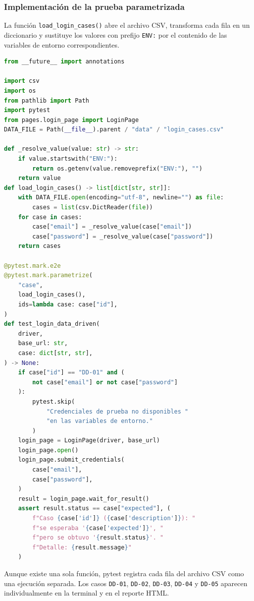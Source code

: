 \documentclass{article}
\begin{document}
\subsubsection{Implementación de la prueba parametrizada}

La función \texttt{load\_login\_cases()} abre el archivo CSV, transforma cada fila en un diccionario y sustituye los valores con prefijo \texttt{ENV:} por el contenido de las variables de entorno correspondientes.

\begin{lstlisting}[language=Python,caption={Prueba data-driven con \texttt{@pytest.mark.parametrize}}]
from __future__ import annotations

import csv
import os
from pathlib import Path
import pytest
from pages.login_page import LoginPage
DATA_FILE = Path(__file__).parent / "data" / "login_cases.csv"

def _resolve_value(value: str) -> str:
    if value.startswith("ENV:"):
        return os.getenv(value.removeprefix("ENV:"), "")
    return value
def load_login_cases() -> list[dict[str, str]]:
    with DATA_FILE.open(encoding="utf-8", newline="") as file:
        cases = list(csv.DictReader(file))
    for case in cases:
        case["email"] = _resolve_value(case["email"])
        case["password"] = _resolve_value(case["password"])
    return cases

@pytest.mark.e2e
@pytest.mark.parametrize(
    "case",
    load_login_cases(),
    ids=lambda case: case["id"],
)
def test_login_data_driven(
    driver,
    base_url: str,
    case: dict[str, str],
) -> None:
    if case["id"] == "DD-01" and (
        not case["email"] or not case["password"]
    ):
        pytest.skip(
            "Credenciales de prueba no disponibles "
            "en las variables de entorno."
        )
    login_page = LoginPage(driver, base_url)
    login_page.open()
    login_page.submit_credentials(
        case["email"],
        case["password"],
    )
    result = login_page.wait_for_result()
    assert result.status == case["expected"], (
        f"Caso {case['id']} ({case['description']}): "
        f"se esperaba '{case['expected']}', "
        f"pero se obtuvo '{result.status}'. "
        f"Detalle: {result.message}"
    )
\end{lstlisting}

Aunque existe una sola función, pytest registra cada fila del archivo CSV como una ejecución separada. Los casos \texttt{DD-01}, \texttt{DD-02}, \texttt{DD-03}, \texttt{DD-04} y \texttt{DD-05} aparecen individualmente en la terminal y en el reporte HTML.
\end{document}
